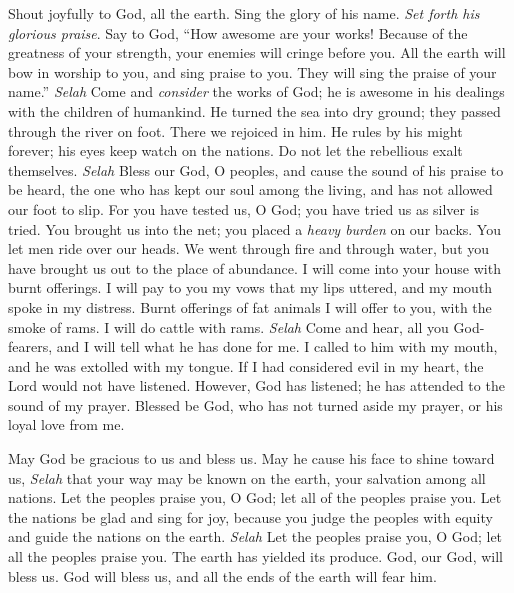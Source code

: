 \begin{biblechapter} %
 Shout joyfully to God, all the earth.
\verse Sing the glory of his name. 
\textit{Set forth his glorious praise}.
\verse Say to God, “How awesome are your works! 
Because of the greatness of your strength, 
your enemies will cringe before you.
\verse All the earth will bow in worship to you, 
and sing praise to you. 
They will sing the praise of your name.” \textit{Selah}
\verse Come and \textit{consider} the works of God; 
he is awesome in his dealings with the children of humankind.
\verse He turned the sea into dry ground; 
they passed through the river on foot. 
There we rejoiced in him.
\verse He rules by his might forever; 
his eyes keep watch on the nations. 
Do not let the rebellious exalt themselves. \textit{Selah}
\verse Bless our God, O peoples, 
and cause the sound of his praise to be heard,
\verse the one who has kept our soul among the living, 
and has not allowed our foot to slip.
\verse For you have tested us, O God; 
you have tried us as silver is tried.
\verse You brought us into the net; 
you placed a \textit{heavy burden} on our backs.
\verse You let men ride over our heads. 
We went through fire and through water, 
but you have brought us out to the place of abundance.
\verse I will come into your house with burnt offerings. 
I will pay to you my vows
\verse that my lips uttered, 
and my mouth spoke in my distress.
\verse Burnt offerings of fat animals I will offer to you, 
with the smoke of rams. 
I will do cattle with rams. \textit{Selah}
\verse Come and hear, all you God-fearers, and I will tell 
what he has done for me.
\verse I called to him with my mouth, 
and he was extolled with my tongue.
\verse If I had considered evil in my heart, 
the Lord would not have listened.
\verse However, God has listened; 
he has attended to the sound of my prayer.
\verse Blessed be God, 
who has not turned aside my prayer, 
or his loyal love from me.
\end{biblechapter}

\begin{biblechapter} %
 May God be gracious to us and bless us. 
May he cause his face to shine toward us, \textit{Selah}
\verse that your way may be known on the earth, 
your salvation among all nations.
\verse Let the peoples praise you, O God; 
let all of the peoples praise you.
\verse Let the nations be glad and sing for joy, 
because you judge the peoples with equity 
and guide the nations on the earth. \textit{Selah}
\verse Let the peoples praise you, O God; 
let all the peoples praise you.
\verse The earth has yielded its produce. 
God, our God, will bless us.
\verse God will bless us, 
and all the ends of the earth will fear him.
\end{biblechapter}

